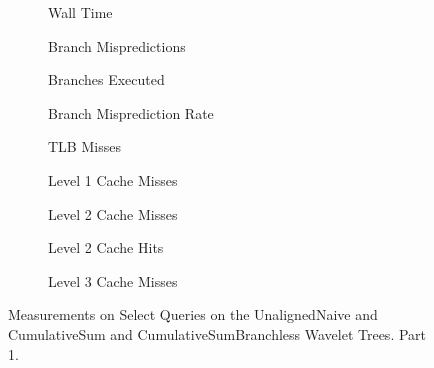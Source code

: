 \begin{figure}\tiny

\begin{subfigure}{0.30\textwidth}
	
	\caption{Wall Time}
	\label{fig:CumulativeSumSelectWalltime}
\end{subfigure}
\hfill
\begin{subfigure}{0.30\textwidth}
	
	\caption{Branch Mispredictions}
	\label{fig:CumulativeSumSelectBranchMiss}
\end{subfigure}
\hfill
\begin{subfigure}{0.30\textwidth}
	
	\caption{Branches Executed}
	\label{fig:CumulativeSumSelectBranchExe}
\end{subfigure}


\begin{subfigure}{0.30\textwidth}
	
	\caption{Branch Misprediction Rate}
	\label{fig:CumulativeSumSelectBranchMissRate}
\end{subfigure}
\hfill
\begin{subfigure}{0.30\textwidth}
	
	\caption{TLB Misses}
	\label{fig:CumulativeSumSelectTLBMiss}
\end{subfigure}
\hfill
\begin{subfigure}{0.30\textwidth}
	
	\caption{Level 1 Cache Misses}
	\label{fig:CumulativeSumSelectL1CM}
\end{subfigure}


\begin{subfigure}{0.30\textwidth}
	
	\caption{Level 2 Cache Misses}
	\label{fig:CumulativeSumSelectL2CM}
\end{subfigure}
\hfill
\begin{subfigure}{0.30\textwidth}
	
	\caption{Level 2 Cache Hits}
	\label{fig:CumulativeSumSelectL2CHits}
\end{subfigure}
\hfill
%	
\begin{subfigure}{0.30\textwidth}
	
	\caption{Level 3 Cache Misses}
	\label{fig:CumulativeSumSelectL3CM}
\end{subfigure}

\caption{Measurements on Select Queries on the UnalignedNaive and CumulativeSum and CumulativeSumBranchless Wavelet Trees. Part 1.}
\label{fig:CumulativeSumSelect}
\end{figure}





\restoregeometry













